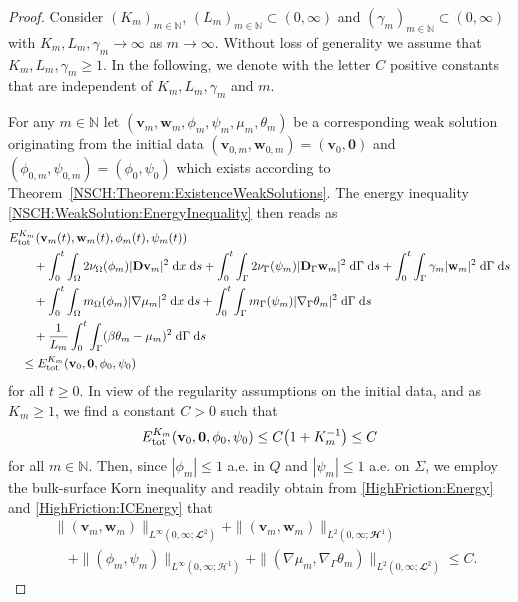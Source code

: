 \documentclass[11pt,reqno]{amsart}
\theoremstyle{remark}
\numberwithin{equation}{section}
\newcommand{\abs}[1]{|#1|}
\newcommand{\norm}[1]{\| #1 \|}
\newcommand{\N}{\mathbb N}
\newcommand{\intO}{\int_\Omega}
\newcommand{\intG}{\int_\Gamma}
\newcommand{\dxs}{\;\mathrm{d}x\;\mathrm{d}s}
\newcommand{\dGs}{\;\mathrm{d}\Ga\;\mathrm{d}s}
\newcommand{\Grad}{\nabla}
\newcommand{\Gradg}{\nabla_\Ga}
\newcommand{\Om}{\Omega}
\newcommand{\Ga}{\Gamma}
\newcommand{\bv}{\mathbf v}
\newcommand{\bw}{\mathbf w}
\newcommand{\D}{\mathbf D}
\newcommand{\Dg}{\mathbf D_\Ga}
\newcommand{\tot}{\textup{tot}}
\begin{document}
\begin{proof}
Consider $(K_m)_{m\in\N}$, $(L_m)_{m\in\N}\subset(0,\infty)$ and $(\gamma_m)_{m\in\N}\subset(0,\infty)$ with $K_m, L_m, \gamma_m \rightarrow\infty$ as $m\rightarrow\infty$. Without loss of generality we assume that $K_m, L_m, \gamma_m \geq 1$. In the following, we denote with the letter $C$ positive constants that are independent of $K_m, L_m, \gamma_m$ and $m$.


For any $m\in\N$ let $(\bv_m,\bw_m,\phi_m,\psi_m,\mu_m,\theta_m)$ be a corresponding weak solution originating from the initial data $(\bv_{0,m},\bw_{0,m}) = (\bv_0,\mathbf 0)$ and $(\phi_{0,m},\psi_{0,m}) = (\phi_0,\psi_0)$ which exists according to Theorem~\ref{NSCH:Theorem:ExistenceWeakSolutions}. The energy inequality \eqref{NSCH:WeakSolution:EnergyInequality} then reads as
\begin{align}\label{HighFriction:Energy}
    &E_\tot^{K_m}(\bv_m(t),\bw_m(t),\phi_m(t),\psi_m(t)) \nonumber \\
    &\qquad + \int_0^t\intO 2\nu_\Om(\phi_m)\abs{\D\bv_m}^2\dxs + \int_0^t\intG 2\nu_\Ga(\psi_m)\abs{\Dg\bw_m}^2\dGs + \int_0^t\intG \gamma_m\abs{\bw_m}^2\dGs \nonumber \\
    &\qquad + \int_0^t\intO m_\Om(\phi_m)\abs{\Grad\mu_m}^2\dxs + \int_0^t\intG m_\Ga(\psi_m)\abs{\Gradg\theta_m}^2\dGs \nonumber \\
    &\qquad + \frac{1}{L_m}\int_0^t\intG (\beta\theta_m-\mu_m)^2\dGs \nonumber \\
    &\quad \leq E_\tot^{K_m}(\bv_0,\mathbf 0,\phi_0,\psi_0)
\end{align}
for all $t\geq 0$. In view of the regularity assumptions on the initial data, and as $K_m\geq 1$, we find a constant $C > 0$ such that
\begin{align}\label{HighFriction:ICEnergy}
    E_\tot^{K_m}(\bv_0,\mathbf 0,\phi_0,\psi_0) \leq C\big(1 + K_m^{-1}\big) \leq C
\end{align}
for all $m\in\N$. Then, since $\abs{\phi_m}\leq 1$ a.e. in $Q$ and $\abs{\psi_m} \leq 1$ a.e. on $\Sigma$, we employ the bulk-surface Korn inequality and readily obtain from \eqref{HighFriction:Energy} and \eqref{HighFriction:ICEnergy} that
\begin{align}\label{Asymp:EnergyInequality}
    &\norm{(\bv_m,\bw_m)}_{L^\infty(0,\infty;\mathbfcal{L}^2)} + \norm{(\bv_m,\bw_m)}_{L^2(0,\infty;\mathbfcal{H}^1)} \nonumber \\
    &\quad + \norm{(\phi_m,\psi_m)}_{L^\infty(0,\infty;\mathcal{H}^1)} + \norm{(\Grad\mu_m,\Gradg\theta_m)}_{L^2(0,\infty;\mathbfcal{L}^2)} \leq C.

\end{align}
\end{proof}
\end{document}
